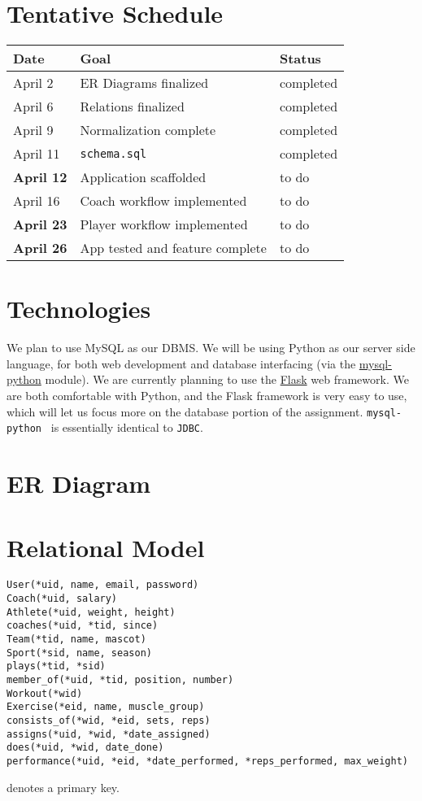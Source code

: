 \documentclass{article}
\begin{document}
    \section*{Tentative Schedule}
    \begin{tabular}{l || l | l}
        Date & Goal & Status \\
        \hline
        April 2 & ER Diagrams finalized & completed \\ 
        April 6 & Relations finalized & completed \\ 
        April 9 & Normalization complete & completed \\ 
        April 11 & {\tt schema.sql} & completed \\ 
        \textbf{April 12} & Application scaffolded & to do \\ 
        April 16 & Coach workflow implemented & to do \\ 
        \textbf{April 23} & Player workflow implemented & to do \\ 
        \textbf{April 26} & App tested and feature complete & to do \\ 
    \end{tabular}

    \section*{Technologies}
    We plan to use MySQL as our DBMS. We will be using Python as our server side language,
    for both web development and database interfacing (via the 
    \href{http://mysql-python.sourceforge.net/MySQLdb.html}{mysql-python} module). 
    We are currently planning to use the \href{http://flask.pocoo.org/}{Flask} web framework.
    We are both comfortable with Python, and the Flask framework is very easy to use, which
    will let us focus more on the database portion of the assignment. {\tt mysql-python } is
    essentially identical to {\tt JDBC}.

    \section*{ER Diagram}
    

    \section*{Relational Model}
    \begin{verbatim}
User(*uid, name, email, password)
Coach(*uid, salary)
Athlete(*uid, weight, height)
coaches(*uid, *tid, since)
Team(*tid, name, mascot)
Sport(*sid, name, season)
plays(*tid, *sid)
member_of(*uid, *tid, position, number)
Workout(*wid)
Exercise(*eid, name, muscle_group)
consists_of(*wid, *eid, sets, reps)
assigns(*uid, *wid, *date_assigned)
does(*uid, *wid, date_done)
performance(*uid, *eid, *date_performed, *reps_performed, max_weight)
    \end{verbatim}
{\tt *} denotes a primary key.
\end{document}
